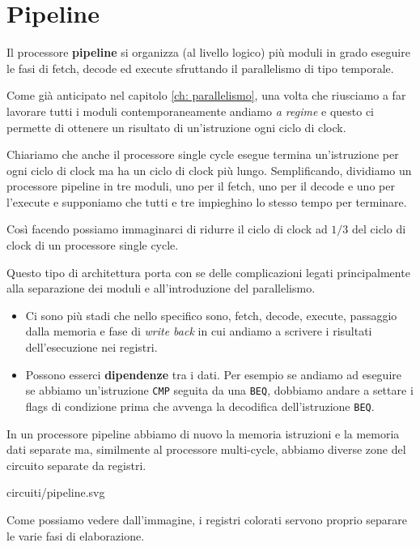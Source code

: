\section{Pipeline}
Il processore \textbf{pipeline} si organizza (al livello logico) più moduli in grado eseguire le
fasi di fetch, decode ed execute sfruttando il parallelismo di tipo temporale.

Come già anticipato nel capitolo \ref{ch: parallelismo}, una volta che riusciamo a far lavorare
tutti i moduli contemporaneamente andiamo \emph{a regime} e questo ci permette di ottenere un
risultato di un'istruzione ogni ciclo di clock.

Chiariamo che anche il processore single cycle esegue termina un'istruzione per ogni ciclo di clock
ma ha un ciclo di clock più lungo. Semplificando, dividiamo un processore pipeline in tre moduli,
uno per il fetch, uno per il decode e uno per l'execute e supponiamo che tutti e tre impieghino lo
stesso tempo per terminare.

Così facendo possiamo immaginarci di ridurre il ciclo di clock ad $1 / 3$ del ciclo di clock di un
processore single cycle.

Questo tipo di architettura porta con se delle complicazioni legati principalmente alla separazione
dei moduli e all'introduzione del parallelismo.
\begin{itemize}
	\item Ci sono più stadi che nello specifico sono, fetch, decode, execute, passaggio dalla
	      memoria e fase di \emph{write back} in cui andiamo a scrivere i risultati dell'esecuzione
	      nei registri.
	\item Possono esserci \textbf{dipendenze} tra i dati. Per esempio se andiamo ad eseguire se
	      abbiamo un'istruzione \verb|CMP| seguita da una \verb|BEQ|, dobbiamo andare a settare
	      i flags di condizione prima che avvenga la decodifica dell'istruzione \verb|BEQ|.
\end{itemize}
In un processore pipeline abbiamo di nuovo la memoria istruzioni e la memoria dati separate ma,
similmente al processore multi-cycle, abbiamo diverse zone del circuito separate da registri.
\begin{center}
	 {circuiti/pipeline.svg}
\end{center}
Come possiamo vedere dall'immagine, i registri colorati servono proprio separare le varie fasi di
elaborazione.

